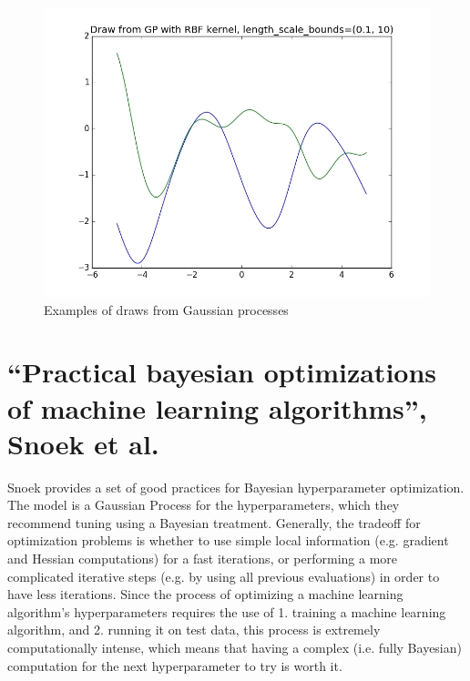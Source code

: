 \documentclass[final]{beamer}
\begin{document}
\begin{frame}[t]
\begin{multicols}{3}
\begin{figure}[h]
  \includegraphics{gp1.png}

  \caption{Examples of draws from Gaussian processes}
\end{figure}


\section{``Practical bayesian optimizations of machine learning algorithms'', Snoek et al.}


Snoek provides a set of good practices for Bayesian hyperparameter optimization. The model is a Gaussian Process for the hyperparameters, which they recommend tuning using a Bayesian treatment. Generally, the tradeoff for optimization problems is whether to use simple local information (e.g. gradient and Hessian computations) for a fast iterations, or performing a more complicated iterative steps (e.g. by using all previous evaluations) in order to have less iterations. Since the process of optimizing a machine learning algorithm's hyperparameters requires the use of 1. training a machine learning algorithm, and 2. running it on test data, this process is extremely computationally intense, which means that having a complex (i.e. fully Bayesian) computation for the next hyperparameter to try is worth it.


\end{multicols}
\end{frame}
\end{document}
